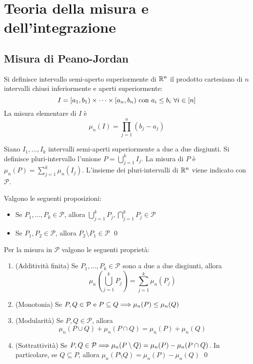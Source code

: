 \chapter{Teoria della misura e dell'integrazione}\label{chap:peano_jordan}

\section{Misura di Peano-Jordan}

\begin{definition}
    Si definisce intervallo semi-aperto superiormente di $\mathbb{R}^n$ il prodotto cartesiano di $n$ intervalli chiusi inferiormente e aperti superiormente:
    $$
        I=[a_1,b_1)\times\cdots\times[a_n,b_n) \text{ con } a_i \leq b_i \ \forall i \in [n]
    $$
    La misura elementare di $I$ è
    $$
        \mu_n(I)=\prod_{j=1}^n(b_j-a_j)
    $$
\end{definition}

\begin{definition}
    Siano $I_1,\dots,I_k$ intervalli semi-aperti superiormente a due a due disgiunti. Si definisce pluri-intervallo l'unione $P=\bigcup\limits_{j=1}^kI_j$. La misura di $P$ è $\mu_n(P)=\sum\limits_{j=1}^k\mu_n(I_j)$. 
    L'insieme dei pluri-intervalli di $\mathbb{R}^n$ viene indicato con $\mathcal{P}$.
\end{definition}

\begin{lemma}
    Valgono le seguenti proposizioni:
    \begin{itemize}
        \item Se $P_1,\dots,P_k \in \mathcal{P}$, allora $\bigcup\limits_{j=1}^k P_j, \bigcap\limits_{j=1}^kP_j \in \mathcal{P}$
        \item Se $P_1,P_2 \in \mathcal{P}$, allora $P_2 \setminus P_1 \in \mathcal{P}$
        \qed
    \end{itemize}
\end{lemma}

\begin{theorem}
    Per la misura in $\mathcal{P}$ valgono le seguenti proprietà:
    \begin{enumerate}
        \item (Additività finita) Se $P_1,\dots,P_k \in \mathcal{P}$ sono a due a due disgiunti, allora
        $$
            \mu_n\left( \bigcup_{j=1}^k P_j \right) = \sum_{j=1}^k \mu_n(P_j)
        $$
        \item (Monotonia) Se $P, Q \in \mathcal{P} \text{ e } P \subseteq Q \Longrightarrow \mu_n(P)\leq \mu_n(Q)$
        \item (Modularità) Se $P,Q \in \mathcal{P}$, allora
        $$
            \mu_n(P\cup Q) + \mu_n (P \cap Q) = \mu_n (P) + \mu_n (Q)
        $$
        \item (Sottrattività) Se $P,Q \in \mathcal{P} \Longrightarrow \mu_n(P\setminus Q)=\mu_n(P)-\mu_n(P\cap Q)$. In particolare, se $Q \subseteq P$, allora $\mu_n(P\setminus Q) = \mu_n (P)-\mu_n(Q)$
        \qed
    \end{enumerate}
\end{theorem}

